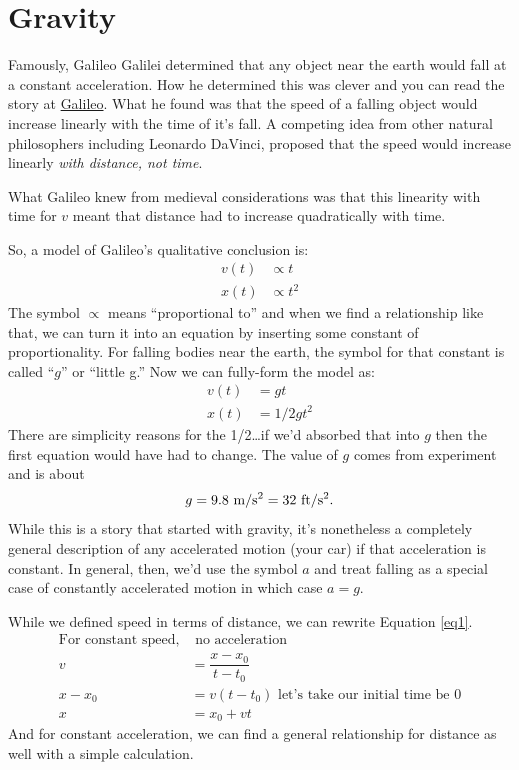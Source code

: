 \documentclass[
  letterpaper,
  DIV=11,
  numbers=noendperiod,
  oneside]{scrreprt}
\begin{document}
\section{Gravity}\label{gravity}

Famously, Galileo Galilei determined that any object near the earth
would fall at a constant acceleration. How he determined this was clever
and you can read the story at
\href{../../history/galileo_free_fall.qmd}{Galileo}. What he found was
that the speed of a falling object would increase linearly with the time
of it's fall. A competing idea from other natural philosophers including
Leonardo DaVinci, proposed that the speed would increase linearly
\emph{with distance, not time}.

What Galileo knew from medieval considerations was that this linearity
with time for \(v\) meant that distance had to increase quadratically
with time.

So, a model of Galileo's qualitative conclusion is: \[
\begin{align}
v(t) &\propto t \nonumber \\
x(t) &\propto t^2 \nonumber
\end{align}
\] The symbol \(\propto\) means ``proportional to'' and when we find a
relationship like that, we can turn it into an equation by inserting
some constant of proportionality. For falling bodies near the earth, the
symbol for that constant is called ``\(g\)'' or ``little g.'' Now we can
fully-form the model as: \[
\begin{align}
v(t) &= gt \nonumber \\
x(t) &= 1/2gt^2 \nonumber
\end{align}
\] There are simplicity reasons for the 1/2\ldots if we'd absorbed that
into \(g\) then the first equation would have had to change. The value
of \(g\) comes from experiment and is about \[
\begin{equation}
g = 9.8 \text{ m/s$^2$} = 32 \text{ ft/s$^2$}.  \nonumber \\
\end{equation}
\] While this is a story that started with gravity, it's nonetheless a
completely general description of any accelerated motion (your car) if
that acceleration is constant. In general, then, we'd use the symbol
\(a\) and treat falling as a special case of constantly accelerated
motion in which case \(a=g\).

While we defined speed in terms of distance, we can rewrite Equation
\ref{eq1}. \[
\begin{align}
\text{For constant speed,}&\text{ no acceleration} \\
v &=\dfrac{x-x_0}{t-t_0} \nonumber \\
x-x_0 &=v(t-t_0) \nonumber \text{ let's take our initial time be 0} \\
x &= x_0 + vt
\end{align}
\] And for constant acceleration, we can find a general relationship for
distance as well with a simple calculation.
\end{document}
